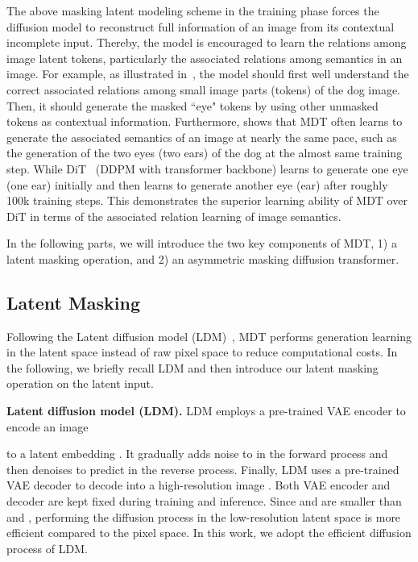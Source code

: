 \documentclass[final]{cvpr}
\newcommand{\myPara}[1]{\vspace{.08in} \noindent\textbf{#1}}
\begin{document}
The above masking latent modeling scheme in the training phase forces the diffusion model 
to reconstruct full information of an image from its contextual incomplete input.
Thereby, the model is encouraged to learn the relations among image latent tokens, 
particularly the associated relations among semantics in an image. 
For example, as illustrated in~,
the model should first well understand the correct associated relations among small image parts (tokens) of the dog image.
Then, it should generate the masked ``eye" tokens by using other unmasked tokens as contextual information. 
Furthermore,  shows that MDT often learns to generate the associated semantics of an image at nearly the same pace, 
such as the generation of the two eyes (two ears) of the dog at the almost same training step.
While DiT~\cite{peebles2022scalable}  (DDPM with transformer backbone) learns to generate one eye (one ear) initially 
and then learns to generate another eye (ear) after roughly 100k training steps. 
This demonstrates the superior learning ability of MDT over DiT in terms of the associated relation learning of image semantics. 


In the following parts, we will introduce the two key components of MDT, 
1) a latent masking operation,  
and 2) an asymmetric masking diffusion transformer.  



\subsection{Latent Masking}	\label{sec:diff_train} 
Following the Latent diffusion model (LDM)~\cite{rombach2022high}, 
MDT performs generation learning in the latent space instead of raw pixel space 
to reduce computational costs. 
In the following, we briefly recall LDM
and then introduce our latent masking operation on the latent input. 



\myPara{Latent diffusion model (LDM).}
LDM employs a pre-trained VAE encoder  to encode an image 

to a latent embedding . 
It gradually adds noise to  in the forward process 
and then denoises to predict  in the reverse process.  
Finally, LDM uses a pre-trained VAE decoder  to decode 
 into a high-resolution image . 
Both VAE encoder and decoder are kept fixed
during training and inference.
Since  and  are smaller than  and , 
performing the diffusion process in the low-resolution latent space is more efficient compared to 
 the pixel space. In this work, we adopt the efficient diffusion process of LDM.  
\end{document}
